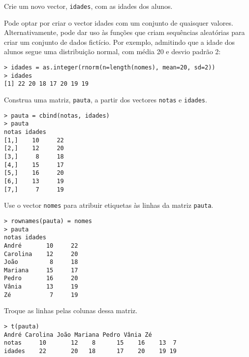 \documentclass{exam}
\begin{document}
\begin{questions}
\question Crie um novo vector, \texttt{idades}, com as idades dos alunos.
\begin{solution}
	Pode optar por criar o vector idades com um conjunto de quaisquer valores. Alternativamente, pode dar uso às funções que criam sequências aleatórias para criar um conjunto de dados fictício. Por exemplo, admitindo que a idade dos alunos segue uma distribuição normal, com média 20 e desvio padrão 2:
	\begin{verbatim}
> idades = as.integer(rnorm(n=length(nomes), mean=20, sd=2))
> idades
[1] 22 20 18 17 20 19 19
	\end{verbatim}
\end{solution}

\question Construa uma matriz, \texttt{pauta}, a partir dos vectores \texttt{notas} e \texttt{idades}.
\begin{solution}
	\begin{verbatim}
> pauta = cbind(notas, idades)
> pauta
notas idades
[1,]    10     22
[2,]    12     20
[3,]     8     18
[4,]    15     17
[5,]    16     20
[6,]    13     19
[7,]     7     19
	\end{verbatim}
\end{solution}

\question Use o vector \texttt{nomes} para atribuir etiquetas às linhas da matriz \texttt{pauta}.
\begin{solution}
	\begin{verbatim}
> rownames(pauta) = nomes
> pauta
notas idades
André       10     22
Carolina    12     20
João         8     18
Mariana     15     17
Pedro       16     20
Vânia       13     19
Zé           7     19
	\end{verbatim}
\end{solution}

\question Troque as linhas pelas colunas dessa matriz.
\begin{solution}
	\begin{verbatim}
> t(pauta)
André Carolina João Mariana Pedro Vânia Zé
notas     10       12    8      15    16    13  7
idades    22       20   18      17    20    19 19
	\end{verbatim}
\end{solution}

\end{questions}
\end{document}
